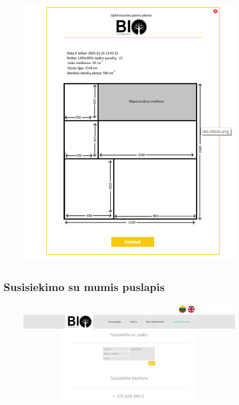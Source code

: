 \documentclass[a4paper,12pt]{article}
\begin{document}
\clearpage


\begin{figure}[!tph]
\hspace{-3cm}
\centering
\includegraphics[scale=1]{interfeisai/optimizavimoPuslapisPrisijungusIsaugotasPlanas}
\label{fig:verticalcell}
\end{figure}

\clearpage

\subsection{Susisiekimo su mumis puslapis}


\begin{figure}[!tph]
\hspace{-3cm}
\centering
\includegraphics[scale=0.5]{interfeisai/susisiekimas}
\label{fig:verticalcell}
\end{figure}
\end{document}
